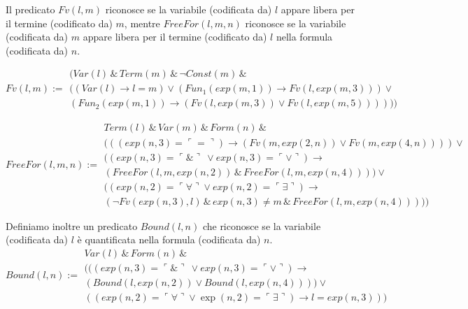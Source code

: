 Il predicato $Fv(l, m)$ riconosce se la variabile (codificata da) $l$ appare libera per il termine (codificato da) $m$, mentre $FreeFor(l,m,n)$ riconosce se la variabile (codificata da) $m$ appare libera per il termine (codificato da) $l$ nella formula (codificata da) $n$.

{\tiny
\begin{displaymath}
Fv(l,m) := \left. \begin{array}{l}(Var(l) \,\&\, Term(m) \,\&\, \neg Const(m) \,\&\, \\
((Var(l)\rightarrow l=m) \vee (Fun_1(exp(m,1))\rightarrow Fv(l,exp(m,3))) \vee \\
(Fun_2(exp(m,1))\rightarrow (Fv(l,exp(m,3))\vee Fv(l,exp(m,5))))
)) 
\end{array} \right.
\end{displaymath}}

{\tiny
\begin{displaymath}
FreeFor(l,m,n):= \left.\begin{array}{l} Term(l) \,\&\, Var(m) \,\&\, Form(n) \,\&\, \\
(((exp(n,3) = \ulcorner = \urcorner)\rightarrow (Fv(m,exp(2,n))\vee Fv(m,exp(4,n))))\vee \\ 
((exp(n,3)= \ulcorner \& \urcorner \ \vee exp(n,3)= \ulcorner \vee \urcorner)\rightarrow \\
(FreeFor(l,m,exp(n,2)) \,\&\, FreeFor(l,m,exp(n,4)))) \vee \\
((exp(n,2) = \ulcorner \forall \urcorner \vee exp(n,2) = \ulcorner \exists \urcorner)\rightarrow \\
(\neg Fv(exp(n,3),l) \,\&\, exp(n,3)\ne m \,\&\, FreeFor(l,m,exp(n,4)))))
\end{array}\right.
\end{displaymath}}

Definiamo inoltre un predicato $Bound(l,n)$ che riconosce se la variabile (codificata da) $l$ \`e quantificata nella formula (codificata da) $n$.
{\tiny
\begin{displaymath}
 Bound(l,n):= \left.\begin{array}{l} Var(l) \,\&\, Form(n)\,\&\, \\
 (((exp(n,3) = \ulcorner \& \urcorner \ \vee exp(n,3)= \ulcorner \vee \urcorner) \rightarrow \\
(Bound(l,exp(n,2))\vee Bound(l,exp(n,4)))) \vee \\
((exp(n,2)= \ulcorner \forall \urcorner \vee \exp(n,2) = \ulcorner \exists \urcorner) \rightarrow l= exp(n,3)))
\end{array}\right.
\end{displaymath}}



